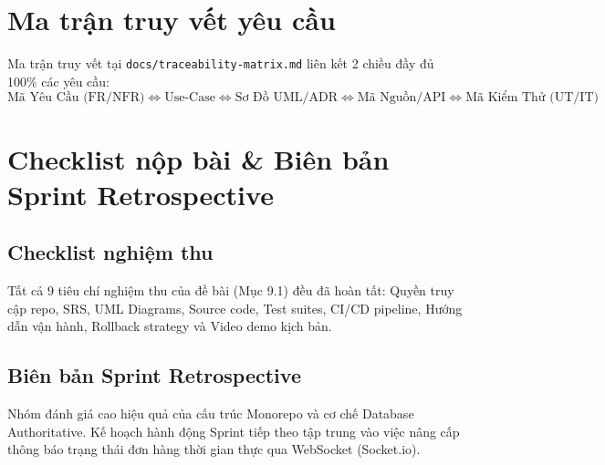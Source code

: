 \documentclass[a4paper]{article}
\begin{document}
\section{Ma trận truy vết yêu cầu}
Ma trận truy vết tại \texttt{docs/traceability-matrix.md} liên kết 2 chiều đầy đủ 100\% các yêu cầu:
$$\text{Mã Yêu Cầu (FR/NFR)} \Longleftrightarrow \text{Use-Case} \Longleftrightarrow \text{Sơ Đồ UML/ADR} \Longleftrightarrow \text{Mã Nguồn/API} \Longleftrightarrow \text{Mã Kiểm Thử (UT/IT)}$$

\section{Checklist nộp bài \& Biên bản Sprint Retrospective}
\subsection{Checklist nghiệm thu}
Tất cả 9 tiêu chí nghiệm thu của đề bài (Mục 9.1) đều đã hoàn tất: Quyền truy cập repo, SRS, UML Diagrams, Source code, Test suites, CI/CD pipeline, Hướng dẫn vận hành, Rollback strategy và Video demo kịch bản.

\subsection{Biên bản Sprint Retrospective}
Nhóm đánh giá cao hiệu quả của cấu trúc Monorepo và cơ chế Database Authoritative. Kế hoạch hành động Sprint tiếp theo tập trung vào việc nâng cấp thông báo trạng thái đơn hàng thời gian thực qua WebSocket (Socket.io).
\end{document}
